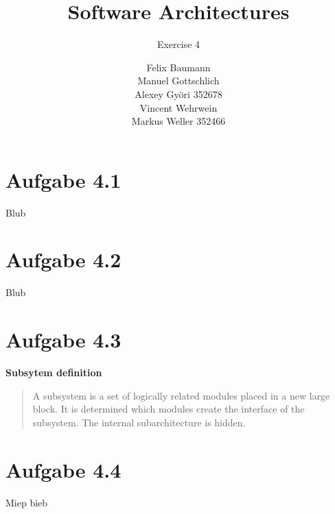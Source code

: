 \documentclass[a4paper,10pt]{scrartcl}[2003/01/01]
\title{Software Architectures}
\subtitle{Exercise 4}
\author{ Felix Baumann \\ Manuel Gottschlich \\  Alexey Gy\"ori 352678 \\ Vincent Wehrwein \\ Markus Weller 352466}
\begin{document}
    \maketitle
    \section*{Aufgabe 4.1}
Blub
    \section*{Aufgabe 4.2}
Blub
    \section*{Aufgabe 4.3}
    
    \textbf{Subsytem definition}
\begin{quote}
A subsystem is a set of logically related modules placed in a new large block. It is determined which modules create the interface of the subsystem. The internal subarchitecture is hidden.
   
\end{quote}
   
    \section*{Aufgabe 4.4}
Miep bieb
\end{document}
